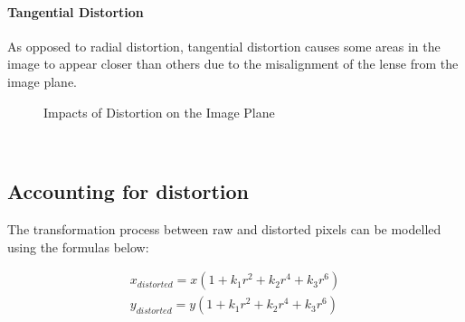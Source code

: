 \documentclass[11pt]{scrartcl}
\begin{document}
\paragraph{Tangential Distortion}
    As opposed to radial distortion, tangential distortion causes some areas in the image to appear 
    closer than others due to the misalignment of the lense from the image plane. 
\\
\begin{figure}[!htb]
    \centering
    \qquad
    \label{fig:example}%
    \caption{Impacts of Distortion on the Image Plane}
\end{figure}
\\ 

\subsection{Accounting for distortion}

The transformation process between raw and distorted pixels can be modelled using the 
formulas below: 

\begin{theorem}
    \begin{align}
    x_{distorted} = x( 1 + k_1 r^2 + k_2 r^4 + k_3 r^6) 
    \\ y_{distorted} = y( 1 + k_1 r^2 + k_2 r^4 + k_3 r^6)    
    \end{align}
    
\end{theorem}
\end{document}
